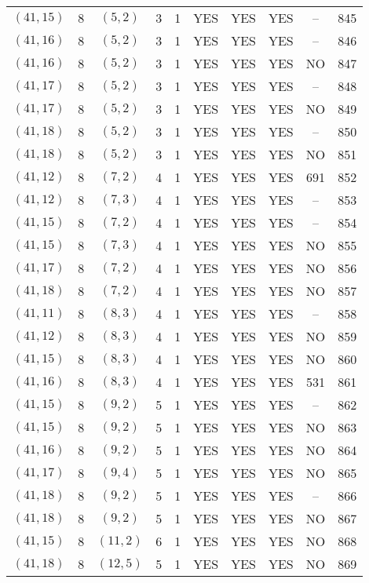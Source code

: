 \begin{longtable}{|c|c|c|c|c|c|c|c|c|c|}
$(41, 15)$ & 8 & $(5, 2)$ & 3 & 1 & YES & YES & YES & -- & 845\\
$(41, 16)$ & 8 & $(5, 2)$ & 3 & 1 & YES & YES & YES & -- & 846\\
$(41, 16)$ & 8 & $(5, 2)$ & 3 & 1 & YES & YES & YES & NO & 847\\
$(41, 17)$ & 8 & $(5, 2)$ & 3 & 1 & YES & YES & YES & -- & 848\\
$(41, 17)$ & 8 & $(5, 2)$ & 3 & 1 & YES & YES & YES & NO & 849\\
$(41, 18)$ & 8 & $(5, 2)$ & 3 & 1 & YES & YES & YES & -- & 850\\
$(41, 18)$ & 8 & $(5, 2)$ & 3 & 1 & YES & YES & YES & NO & 851\\
$(41, 12)$ & 8 & $(7, 2)$ & 4 & 1 & YES & YES & YES & 691 & 852\\
$(41, 12)$ & 8 & $(7, 3)$ & 4 & 1 & YES & YES & YES & -- & 853\\
$(41, 15)$ & 8 & $(7, 2)$ & 4 & 1 & YES & YES & YES & -- & 854\\
$(41, 15)$ & 8 & $(7, 3)$ & 4 & 1 & YES & YES & YES & NO & 855\\
$(41, 17)$ & 8 & $(7, 2)$ & 4 & 1 & YES & YES & YES & NO & 856\\
$(41, 18)$ & 8 & $(7, 2)$ & 4 & 1 & YES & YES & YES & NO & 857\\
$(41, 11)$ & 8 & $(8, 3)$ & 4 & 1 & YES & YES & YES & -- & 858\\
$(41, 12)$ & 8 & $(8, 3)$ & 4 & 1 & YES & YES & YES & NO & 859\\
$(41, 15)$ & 8 & $(8, 3)$ & 4 & 1 & YES & YES & YES & NO & 860\\
$(41, 16)$ & 8 & $(8, 3)$ & 4 & 1 & YES & YES & YES & 531 & 861\\
$(41, 15)$ & 8 & $(9, 2)$ & 5 & 1 & YES & YES & YES & -- & 862\\
$(41, 15)$ & 8 & $(9, 2)$ & 5 & 1 & YES & YES & YES & NO & 863\\
$(41, 16)$ & 8 & $(9, 2)$ & 5 & 1 & YES & YES & YES & NO & 864\\
$(41, 17)$ & 8 & $(9, 4)$ & 5 & 1 & YES & YES & YES & NO & 865\\
$(41, 18)$ & 8 & $(9, 2)$ & 5 & 1 & YES & YES & YES & -- & 866\\
$(41, 18)$ & 8 & $(9, 2)$ & 5 & 1 & YES & YES & YES & NO & 867\\
$(41, 15)$ & 8 & $(11, 2)$ & 6 & 1 & YES & YES & YES & NO & 868\\
$(41, 18)$ & 8 & $(12, 5)$ & 5 & 1 & YES & YES & YES & NO & 869\\

\end{longtable}
